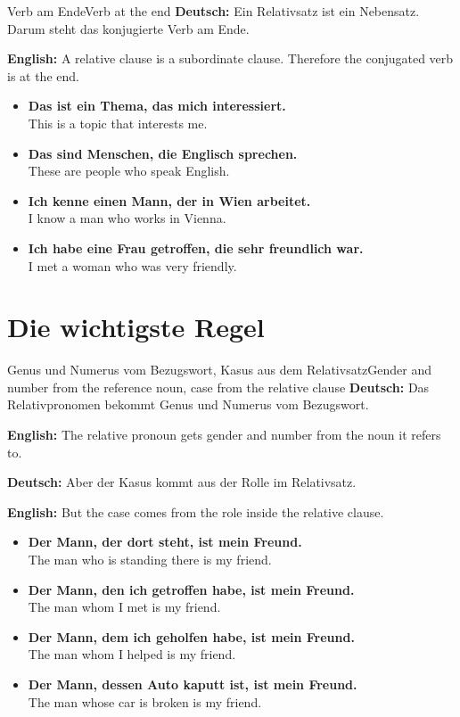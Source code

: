 \documentclass[a4paper,11pt]{article}
\newcommand{\GermanText}[1]{\textbf{Deutsch: }#1\par}
\newcommand{\EnglishText}[1]{{\small\color{SoftGray}\textbf{English: }#1\par}}
\newcommand{\ExampleItem}[2]{\item \textbf{#1}\\{\small\color{SoftGray}#2}}
\begin{document}
        \begin{grammarentry}{Verb am Ende}{Verb at the end}
            \GermanText{Ein Relativsatz ist ein Nebensatz. Darum steht das konjugierte Verb am Ende.}
            \EnglishText{A relative clause is a subordinate clause. Therefore the conjugated verb is at the end.}
            
            \begin{exbox}
                \begin{itemize}
                    \ExampleItem{Das ist ein Thema, das mich interessiert.}{This is a topic that interests me.}
                    \ExampleItem{Das sind Menschen, die Englisch sprechen.}{These are people who speak English.}
                    \ExampleItem{Ich kenne einen Mann, der in Wien arbeitet.}{I know a man who works in Vienna.}
                    \ExampleItem{Ich habe eine Frau getroffen, die sehr freundlich war.}{I met a woman who was very friendly.}
                \end{itemize}
            \end{exbox}
        \end{grammarentry}
    
    
    \section{Die wichtigste Regel}
        
        \begin{grammarentry}{Genus und Numerus vom Bezugswort, Kasus aus dem Relativsatz}{Gender and number from the reference noun, case from the relative clause}
            \GermanText{Das Relativpronomen bekommt Genus und Numerus vom Bezugswort.}
            \EnglishText{The relative pronoun gets gender and number from the noun it refers to.}
            
            \GermanText{Aber der Kasus kommt aus der Rolle im Relativsatz.}
            \EnglishText{But the case comes from the role inside the relative clause.}
            
            \begin{exbox}
                \begin{itemize}
                    \ExampleItem{Der Mann, der dort steht, ist mein Freund.}{The man who is standing there is my friend.}
                    \ExampleItem{Der Mann, den ich getroffen habe, ist mein Freund.}{The man whom I met is my friend.}
                    \ExampleItem{Der Mann, dem ich geholfen habe, ist mein Freund.}{The man whom I helped is my friend.}
                    \ExampleItem{Der Mann, dessen Auto kaputt ist, ist mein Freund.}{The man whose car is broken is my friend.}
                \end{itemize}
            \end{exbox}
        \end{grammarentry}
    
\end{document}
